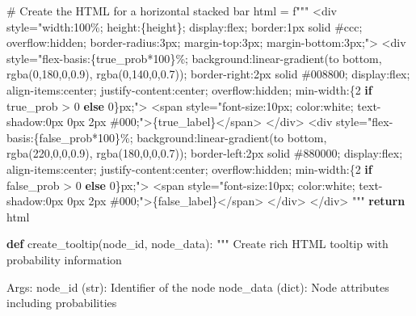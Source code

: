 \documentclass[
  11pt,
  letterpaper,
]{book}
\newenvironment{Shaded}{\begin{snugshade}}{\end{snugshade}}
\newcommand{\CommentTok}[1]{\textcolor[rgb]{0.37,0.37,0.37}{#1}}
\newcommand{\ControlFlowTok}[1]{\textcolor[rgb]{0.00,0.23,0.31}{\textbf{#1}}}
\newcommand{\DecValTok}[1]{\textcolor[rgb]{0.68,0.00,0.00}{#1}}
\newcommand{\KeywordTok}[1]{\textcolor[rgb]{0.00,0.23,0.31}{\textbf{#1}}}
\newcommand{\NormalTok}[1]{\textcolor[rgb]{0.00,0.23,0.31}{#1}}
\newcommand{\OperatorTok}[1]{\textcolor[rgb]{0.37,0.37,0.37}{#1}}
\newcommand{\SpecialCharTok}[1]{\textcolor[rgb]{0.37,0.37,0.37}{#1}}
\newcommand{\SpecialStringTok}[1]{\textcolor[rgb]{0.13,0.47,0.30}{#1}}
\begin{document}
\begin{Shaded}
\begin{Highlighting}[]
    \CommentTok{\# Create the HTML for a horizontal stacked bar}
\NormalTok{    html }\OperatorTok{=} \SpecialStringTok{f"""}
\SpecialStringTok{    \textless{}div style="width:100\%; height:}\SpecialCharTok{\{}\NormalTok{height}\SpecialCharTok{\}}\SpecialStringTok{; display:flex; border:1px solid \#ccc; overflow:hidden; border{-}radius:3px; margin{-}top:3px; margin{-}bottom:3px;"\textgreater{}}
\SpecialStringTok{        \textless{}div style="flex{-}basis:}\SpecialCharTok{\{}\NormalTok{true\_prob}\OperatorTok{*}\DecValTok{100}\SpecialCharTok{\}}\SpecialStringTok{\%; background:linear{-}gradient(to bottom, rgba(0,180,0,0.9), rgba(0,140,0,0.7)); border{-}right:2px solid \#008800; display:flex; align{-}items:center; justify{-}content:center; overflow:hidden; min{-}width:}\SpecialCharTok{\{}\DecValTok{2} \ControlFlowTok{if}\NormalTok{ true\_prob }\OperatorTok{\textgreater{}} \DecValTok{0} \ControlFlowTok{else} \DecValTok{0}\SpecialCharTok{\}}\SpecialStringTok{px;"\textgreater{}}
\SpecialStringTok{            \textless{}span style="font{-}size:10px; color:white; text{-}shadow:0px 0px 2px \#000;"\textgreater{}}\SpecialCharTok{\{}\NormalTok{true\_label}\SpecialCharTok{\}}\SpecialStringTok{\textless{}/span\textgreater{}}
\SpecialStringTok{        \textless{}/div\textgreater{}}
\SpecialStringTok{        \textless{}div style="flex{-}basis:}\SpecialCharTok{\{}\NormalTok{false\_prob}\OperatorTok{*}\DecValTok{100}\SpecialCharTok{\}}\SpecialStringTok{\%; background:linear{-}gradient(to bottom, rgba(220,0,0,0.9), rgba(180,0,0,0.7)); border{-}left:2px solid \#880000; display:flex; align{-}items:center; justify{-}content:center; overflow:hidden; min{-}width:}\SpecialCharTok{\{}\DecValTok{2} \ControlFlowTok{if}\NormalTok{ false\_prob }\OperatorTok{\textgreater{}} \DecValTok{0} \ControlFlowTok{else} \DecValTok{0}\SpecialCharTok{\}}\SpecialStringTok{px;"\textgreater{}}
\SpecialStringTok{            \textless{}span style="font{-}size:10px; color:white; text{-}shadow:0px 0px 2px \#000;"\textgreater{}}\SpecialCharTok{\{}\NormalTok{false\_label}\SpecialCharTok{\}}\SpecialStringTok{\textless{}/span\textgreater{}}
\SpecialStringTok{        \textless{}/div\textgreater{}}
\SpecialStringTok{    \textless{}/div\textgreater{}}
\SpecialStringTok{    """}
    \ControlFlowTok{return}\NormalTok{ html}

\KeywordTok{def}\NormalTok{ create\_tooltip(node\_id, node\_data):}
    \CommentTok{"""}
\CommentTok{    Create rich HTML tooltip with probability information}

\CommentTok{    Args:}
\CommentTok{        node\_id (str): Identifier of the node}
\CommentTok{        node\_data (dict): Node attributes including probabilities}


\end{Highlighting}
\end{Shaded}
\end{document}
